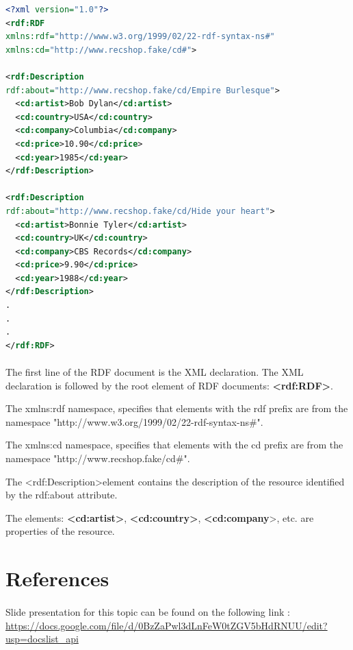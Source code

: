 \documentclass[a4paper,11pt]{report}
\begin{document}
\begin{lstlisting}[language=XML]
<?xml version="1.0"?>
<rdf:RDF
xmlns:rdf="http://www.w3.org/1999/02/22-rdf-syntax-ns#"
xmlns:cd="http://www.recshop.fake/cd#">

<rdf:Description
rdf:about="http://www.recshop.fake/cd/Empire Burlesque">
  <cd:artist>Bob Dylan</cd:artist>
  <cd:country>USA</cd:country>
  <cd:company>Columbia</cd:company>
  <cd:price>10.90</cd:price>
  <cd:year>1985</cd:year>
</rdf:Description>

<rdf:Description
rdf:about="http://www.recshop.fake/cd/Hide your heart">
  <cd:artist>Bonnie Tyler</cd:artist>
  <cd:country>UK</cd:country>
  <cd:company>CBS Records</cd:company>
  <cd:price>9.90</cd:price>
  <cd:year>1988</cd:year>
</rdf:Description>
.
.
.
</rdf:RDF> 


\end{lstlisting}
\paragraph{}
The first line of the RDF document is the XML declaration. The XML declaration is followed by the root element of RDF documents: \textbf{\textless rdf:RDF\textgreater}.

The xmlns:rdf namespace, specifies that elements with the rdf prefix are from the namespace "http://www.w3.org/1999/02/22-rdf-syntax-ns\#".

The xmlns:cd namespace, specifies that elements with the cd prefix are from the namespace "http://www.recshop.fake/cd\#".

The \textless rdf:Description\textgreater element contains the description of the resource identified by the rdf:about attribute.

The elements: \textbf{\textless cd:artist\textgreater}, \textbf{\textless cd:country\textgreater}, \textbf{\textless cd:company}\textgreater, etc. are properties of the resource.

\section{References}
\paragraph{}
Slide presentation for this topic can be found on the following link : \url{https://docs.google.com/file/d/0BzZaPwl3dLnFeW0tZGV5bHdRNUU/edit?usp=docslist_api} \cite{w3crdf,rdfrules,wikirdf,semantic,video1}
\end{document}
